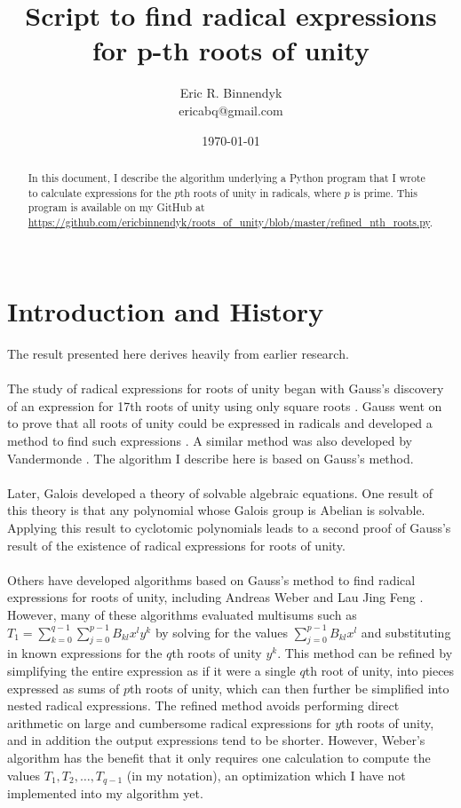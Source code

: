 \documentclass{article}
\title{Script to find radical expressions for p-th roots of unity}
\author{Eric R. Binnendyk \\ ericabq@gmail.com}
\date{\today}
\begin{document}
\maketitle

\begin{abstract}
    In this document, I describe the algorithm underlying a Python program that I wrote to calculate expressions for the $ p $th roots of unity in radicals, where $ p $ is prime. This program is available on my GitHub at \url{https://github.com/ericbinnendyk/roots_of_unity/blob/master/refined_nth_roots.py}.\\
    \\
\end{abstract}

\section{Introduction and History}
    The result presented here derives heavily from earlier research.\\
    \\
    The study of radical expressions for roots of unity began with Gauss's discovery of an expression for 17th roots of unity using only square roots \cite{17gon}. Gauss went on to prove that all roots of unity could be expressed in radicals and developed a method to find such expressions \cite{rootsunity}. A similar method was also developed by Vandermonde \cite{rootsunity-misc}. The algorithm I describe here is based on Gauss's method.\\
    \\
    Later, Galois developed a theory of solvable algebraic equations. One result of this theory is that any polynomial whose Galois group is Abelian is solvable. Applying this result to cyclotomic polynomials leads to a second proof of Gauss's result of the existence of radical expressions for roots of unity.\cite{weber-keckeisen}\\
    \\
    Others have developed algorithms based on Gauss's method to find radical expressions for roots of unity, including Andreas Weber \cite{weber} and Lau Jing Feng \cite{feng}. However, many of these algorithms evaluated multisums such as $ T_1 = \sum_{k = 0}^{q - 1} \sum_{j = 0}^{p - 1} B_{kl} x^l y^k $ by solving for the values $ \sum_{j = 0}^{p - 1} B_{kl} x^l $ and substituting in known expressions for the $ q $th roots of unity $ y^k $. This method can be refined by simplifying the entire expression as if it were a single $ q $th root of unity, into pieces expressed as sums of $ p $th roots of unity, which can then further be simplified into nested radical expressions. The refined method avoids performing direct arithmetic on large and cumbersome radical expressions for $ y $th roots of unity, and in addition the output expressions tend to be shorter. However, Weber's algorithm has the benefit that it only requires one calculation to compute the values $ T_1, T_2, \dots, T_{q - 1} $ (in my notation), an optimization which I have not implemented into my algorithm yet.\\
    \\
\end{document}
